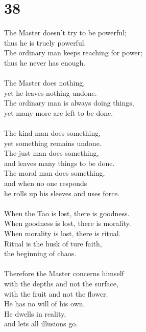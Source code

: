 \documentclass[b5paper, 12pt, oneside]{book}
\begin{document}
\chapter*{38}
The Master doesn't try to be powerful;\\
thus he is truely powerful.\\
The ordinary man keeps reaching for power;\\
thus he never has enough.\\
\\
The Master does nothing,\\
yet he leaves nothing undone.\\
The ordinary man is always doing things,\\
yet many more are left to be done.\\
\\
The kind man does something,\\
yet something remains undone.\\
The just man does something,\\
and leaves many things to be done.\\
The moral man does something,\\
and when no one responds\\
he rolls up his sleeves and uses force.\\
\\
When the Tao is lost, there is goodness.\\
When goodness is lost, there is morality.\\
When morality is lost, there is ritual.\\
Ritual is the husk of ture faith,\\
the beginning of chaos.\\
\\
Therefore the Master concerns himself\\
with the depths and not the surface,\\
with the fruit and not the flower.\\
He has no will of his own.\\
He dwells in reality,\\
and lets all illusions go.\\
\end{document}

